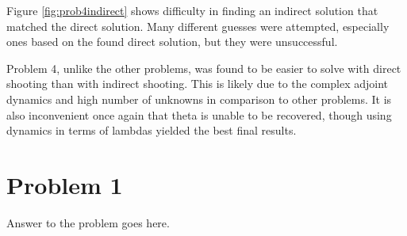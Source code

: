 \documentclass[12pt,letterpaper]{article}
\begin{document}
Figure \ref{fig:prob4indirect} shows difficulty in finding an indirect solution that matched the direct solution. Many different guesses were attempted, especially ones based on the found direct solution, but they were unsuccessful. 



\clearpage


Problem 4, unlike the other problems, was found to be easier to solve with direct shooting than with indirect shooting. This is likely due to the complex adjoint dynamics and high number of unknowns in comparison to other problems. It is also inconvenient once again that theta is unable to be recovered, though using dynamics in terms of lambdas yielded the best final results.

\iffalse
\section*{Problem 1}
Answer to the problem goes here.
\end{document}
